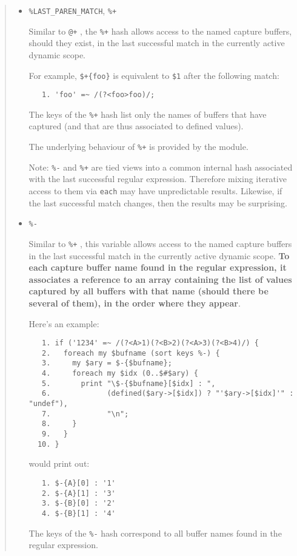 \begin{it}
\begin{quotation}
\begin{itemize}
\item \verb|%LAST_PAREN_MATCH|, \verb|%+|

Similar to \verb|@+| , the \verb|%+| hash allows access to the named capture buffers,
should they exist, in the last successful match in the currently active
dynamic scope.

For example, \verb|$+{foo}| is equivalent to \verb|$1| after the following match:

\begin{verbatim}
   1. 'foo' =~ /(?<foo>foo)/;
\end{verbatim}

The keys of the \verb|%+| hash list only the names of buffers that have
captured (and that are thus associated to defined values).

The underlying behaviour of \verb|%+| is provided by the  
module.

Note: \verb|%-| and \verb|%+| are tied views into a common internal
hash associated with the last successful regular expression. Therefore
mixing iterative access to them via \verb|each| may have unpredictable
results. Likewise, if the last successful match changes, then the results
may be surprising.

\item \verb|%-|

Similar to \verb|%+| , this variable allows access to the named capture
buffers in the last successful match in the currently active dynamic
scope. {\bf To each capture buffer name found in the regular expression,
it associates a reference to an array containing the list of values
captured by all buffers with that name (should there be several of them),
in the order where they appear}.

Here's an example:

\begin{verbatim}
   1. if ('1234' =~ /(?<A>1)(?<B>2)(?<A>3)(?<B>4)/) {
   2.   foreach my $bufname (sort keys %-) {
   3.     my $ary = $-{$bufname};
   4.     foreach my $idx (0..$#$ary) {
   5.       print "\$-{$bufname}[$idx] : ",
   6.             (defined($ary->[$idx]) ? "'$ary->[$idx]'" : "undef"),
   7.             "\n";
   8.     }
   9.   }
  10. }
\end{verbatim}

would print out:

\begin{verbatim}
   1. $-{A}[0] : '1'
   2. $-{A}[1] : '3'
   3. $-{B}[0] : '2'
   4. $-{B}[1] : '4'
\end{verbatim}

The keys of the \verb|%-| hash correspond to all buffer names found in
the regular expression.

\end{itemize}
\end{quotation}
\end{it}

